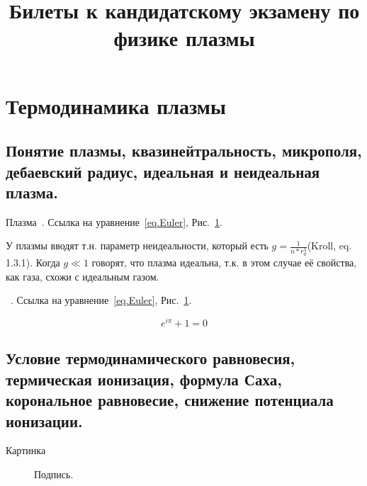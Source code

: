 \documentclass[10pt, a4paper]{article}
\title{Билеты к кандидатскому экзамену по физике плазмы}
\date{}
\begin{document}
\newpage
\section{Термодинамика плазмы}
\label{sec.1}

\subsection{Понятие плазмы, квазинейтральность, микрополя, дебаевский радиус, идеальная и неидеальная плазма.}
\label{sec.1.1}

Плазма~\cite{kotelnikov}. Ссылка на уравнение~\eqref{eq.Euler}, Рис.~\ref{fig.1.2.1}.

У плазмы вводят т.н. параметр неидеальности, который есть $g = \frac{1}{n * r_d^3}$(Kroll, eq. 1.3.1). Когда 
$g \ll 1$ говорят, что плазма идеальна, т.к. в этом случае её свойства, как газа, схожи с идеальным газом.



~\cite{kotelnikov}. Ссылка на уравнение~\eqref{eq.Euler}, Рис.~\ref{fig.1.2.1}.


\begin{equation}
    \label{eq.Euler}
    e^{i \pi} + 1 = 0
\end{equation}

\subsection{Условие термодинамического равновесия, термическая ионизация, формула Саха, корональное равновесие, снижение потенциала ионизации.}
\label{sec.1.2}

Картинка

\begin{figure}[h!]
    \caption{\label{fig.1.2.1} Подпись.}
\end{figure}
\end{document}
